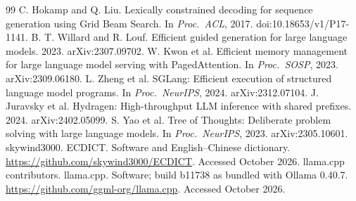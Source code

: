 \documentclass[11pt,a4paper,fontset=windows]{ctexart}
\begin{document}
\begin{thebibliography}{99}
 C. Hokamp and Q. Liu. Lexically constrained decoding for sequence generation using Grid Beam Search. In \emph{Proc.\ ACL}, 2017. doi:10.18653/v1/P17-1141.
 B. T. Willard and R. Louf. Efficient guided generation for large language models. 2023. arXiv:2307.09702.
 W. Kwon et al. Efficient memory management for large language model serving with PagedAttention. In \emph{Proc.\ SOSP}, 2023. arXiv:2309.06180.
 L. Zheng et al. SGLang: Efficient execution of structured language model programs. In \emph{Proc.\ NeurIPS}, 2024. arXiv:2312.07104.
 J. Juravsky et al. Hydragen: High-throughput LLM inference with shared prefixes. 2024. arXiv:2402.05099.
 S. Yao et al. Tree of Thoughts: Deliberate problem solving with large language models. In \emph{Proc.\ NeurIPS}, 2023. arXiv:2305.10601.
 skywind3000. ECDICT. Software and English--Chinese dictionary. \url{https://github.com/skywind3000/ECDICT}. Accessed October 2026.
 llama.cpp contributors. llama.cpp. Software; build b11738 as bundled with Ollama 0.40.7. \url{https://github.com/ggml-org/llama.cpp}. Accessed October 2026.
\end{thebibliography}
\endgroup

\clearpage
\end{document}
